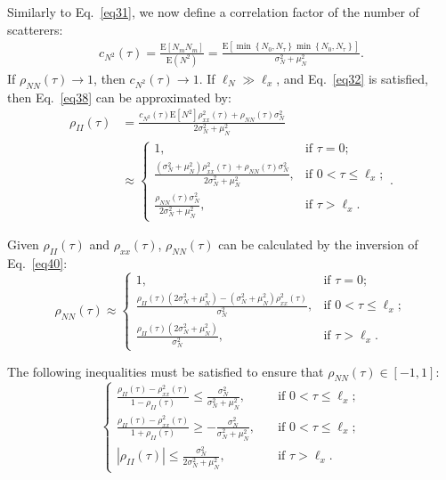 \documentclass[journal]{IEEEtran}
\begin{document}
Similarly to Eq.~\eqref{eq31}, we now define a correlation factor of the number of scatterers:
\begin{align}
c_{N^2}(\tau) = \frac{\mathrm{E}\left[N_{m} N_{m}\right]}{\mathrm{E}\left(N^{2}\right)}
=\frac{\mathrm{E}\left[\min \left\{N_{0}, N_{\tau}\right\} \min \left\{N_{0}, N_{\tau}\right\}\right]}{\sigma_{N}^{2}+\mu_{N}^{2}}.
\label{eq39}
\end{align}
If $\rho_{N N}(\tau) \rightarrow 1$, then $c_{N^{2}}(\tau) \rightarrow 1$. If $\ell_{N} \gg \ell_x$, and Eq.~\eqref{eq32} is satisfied, then Eq.~\eqref{eq38} can be approximated by:
\begin{align}
\rho_{I I}(\tau) & = \frac{c_{N^{2}}(\tau) \mathrm{E}\left[N^{2}\right] \rho_{x x}^{2}(\tau)+\rho_{N N}(\tau) \sigma_{N}^{2}}{2 \sigma_{N}^{2}+\mu_{N}^{2}} \nonumber \\
& \approx \begin{cases}
1,& \text{if } \tau=0 ;\\
\frac{\left(\sigma_{N}^{2}+\mu_{N}^{2}\right) \rho_{x x}^{2}(\tau)+\rho_{N N}(\tau) \sigma_{N}^{2}}{2 \sigma_{N}^{2}+\mu_{N}^{2}},& \text{if } 0<\tau \leq \ell_{x} ; \\
\frac{\rho_{N N}(\tau) \sigma_{N}^{2}}{2 \sigma_{N}^{2}+\mu_{N}^{2}},& \text{if } \tau > \ell_{x}.
\label{eq40}
\end{cases}.
\end{align}

Given $\rho_{I I}(\tau)$ and $\rho_{x x}(\tau)$, $\rho_{N N}(\tau)$ can be calculated by the inversion of Eq.~\eqref{eq40}:
\begin{equation}
\rho_{N N}(\tau) \approx \begin{cases}
1,& \text{if } \tau=0 ;\\
\frac{\rho_{I I}(\tau)\left(2 \sigma_{N}^{2}+\mu_{N}^{2}\right)-\left(\sigma_{N}^{2}+\mu_{N}^{2}\right) \rho_{x x}^{2}(\tau)}{\sigma_{N}^{2}},& \text{if } 0<\tau \leq \ell_{x} ;\\
\frac{\rho_{I I}(\tau)\left(2 \sigma_{N}^{2}+\mu_{N}^{2}\right)}{\sigma_{N}^{2}},& \text{if } \tau > \ell_{x}.
\label{eq41}
\end{cases}
\end{equation}

The following inequalities must be satisfied to ensure that $\rho_{N N}(\tau) \in[-1,1]$:
\begin{equation}
\left\{\begin{aligned} \frac{\rho_{I I}(\tau)-\rho_{x x}^{2}(\tau)}{1-\rho_{I I}(\tau)} \leq \frac{\sigma_{N}^{2}}{\sigma_{N}^{2}+\mu_{N}^{2}},\quad & \text{if } 0<\tau \leq \ell_{x} ; \\ \frac{\rho_{I I}(\tau)-\rho_{x x}^{2}(\tau)}{1+\rho_{I I}(\tau)} \geq -\frac{\sigma_{N}^{2}}{\sigma_{N}^{2}+\mu_{N}^{2}},\quad & \text{if } 0<\tau \leq \ell_{x} ; \\
\left|\rho_{I I}(\tau)\right|\leq \frac{\sigma_{N}^{2}}{2 \sigma_{N}^{2}+\mu_{N}^{2}},\quad & \text{if } \tau > \ell_{x}. \end{aligned}\right.
\label{eq42}
\end{equation}
\end{document}
